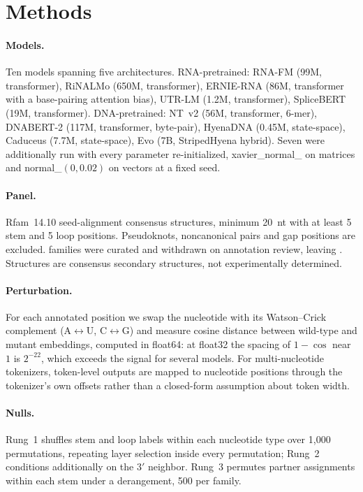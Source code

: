 \documentclass{article}
\begin{document}



\appendix
\section{Methods}
\label{app:methods}

\paragraph{Models.} Ten models spanning five architectures. RNA-pretrained:
RNA-FM (99M, transformer), RiNALMo (650M, transformer), ERNIE-RNA (86M,
transformer with a base-pairing attention bias), UTR-LM (1.2M,
transformer), SpliceBERT (19M, transformer). DNA-pretrained: NT~v2 (56M,
transformer, 6-mer), DNABERT-2 (117M, transformer, byte-pair), HyenaDNA (0.45M,
state-space), Caduceus (7.7M, state-space), Evo (7B, StripedHyena hybrid). Seven were
additionally run with every parameter re-initialized, xavier\_normal\_ on
matrices and normal\_$(0, 0.02)$ on vectors at a fixed seed.

\paragraph{Panel.} Rfam~14.10 seed-alignment consensus structures, minimum
20~nt with at least 5 stem and 5 loop positions. Pseudoknots, noncanonical
pairs and gap positions are excluded. \panelCurated{} families were curated and
\panelWithdrawn{} withdrawn on annotation review, leaving \panelN{}. Structures
are consensus secondary structures, not experimentally determined.

\paragraph{Perturbation.} For each annotated position we swap the nucleotide
with its Watson--Crick complement (A$\leftrightarrow$U, C$\leftrightarrow$G) and
measure cosine distance between wild-type and mutant embeddings, computed in
float64: at float32 the spacing of $1 - \cos$ near $1$ is $2^{-22}$, which
exceeds the signal for several models. For multi-nucleotide tokenizers,
token-level outputs are mapped to nucleotide positions through the tokenizer's
own offsets rather than a closed-form assumption about token width.

\paragraph{Nulls.} Rung~1 shuffles stem and loop labels within each nucleotide
type over 1{,}000 permutations, repeating layer selection inside every
permutation; Rung~2 conditions additionally on the 3$'$ neighbor. Rung~3
permutes partner assignments within each stem under a derangement, 500 per
family.
\end{document}
